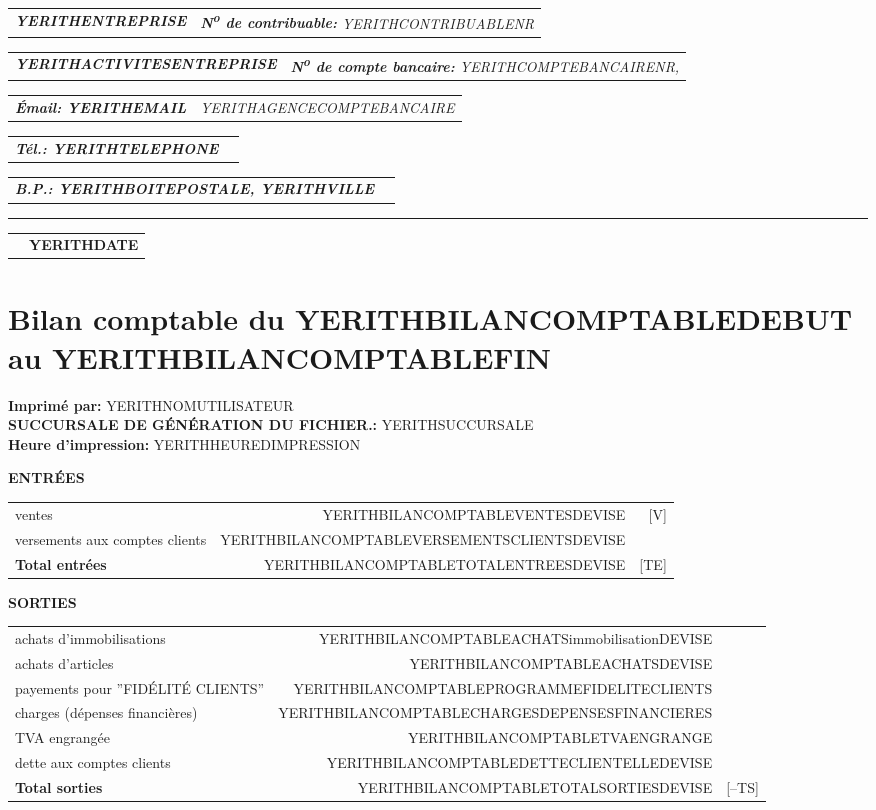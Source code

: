 \documentclass[10pt,YERITHPAPERSPEC,landscape]{article} %
\makeatletter
\newcommand{\headerrow}[2]
{\begin{tabular*}{\linewidth}{l@{\extracolsep{\fill}}r}
	#1 &
	#2 \\
\end{tabular*}}
\newcommand{\emphbold}[1]{\textbf{\emph{#1}}\xspace}
\makeatother
\begin{document}
\bigskip

\headerrow
	{\emphbold{YERITHENTREPRISE}}
	{\emph{\textbf{N\textsuperscript{o} de contribuable:} YERITHCONTRIBUABLENR}}
\headerrow
	{\emphbold{YERITHACTIVITESENTREPRISE}}
	{\emph{\textbf{N\textsuperscript{o} de compte bancaire:} YERITHCOMPTEBANCAIRENR,}}
\headerrow
	{\emphbold{\'Email: YERITHEMAIL}}
	{\emph{YERITHAGENCECOMPTEBANCAIRE}}
\headerrow
	{\emphbold{T\'el.: YERITHTELEPHONE}}
	{}
\headerrow
	{\emphbold{B.P.: YERITHBOITEPOSTALE, YERITHVILLE}}
	{}
	
\hrule

\headerrow
	{}
	{\textbf{YERITHDATE}}

\section*{Bilan comptable du YERITHBILANCOMPTABLEDEBUT au YERITHBILANCOMPTABLEFIN}

\textbf{Imprim\'e par:} YERITHNOMUTILISATEUR\\
\textbf{SUCCURSALE DE GÉNÉRATION DU FICHIER.:} YERITHSUCCURSALE\\
\textbf{Heure d'impression:} YERITHHEUREDIMPRESSION\\

\vspace*{0.15em}

\textbf{ENTR\'EES}
\begin{table}[!htbp]
\begin{tabular}{lrr}
ventes  						&  YERITHBILANCOMPTABLEVENTESDEVISE  			& [V] \\ 
versements aux comptes clients  &  YERITHBILANCOMPTABLEVERSEMENTSCLIENTSDEVISE  & \\ \hline
\textbf{Total entr\'ees}  		&  YERITHBILANCOMPTABLETOTALENTREESDEVISE & [TE] 		\\ 
\end{tabular}
\end{table}


\vspace*{0.15em}
\textbf{SORTIES}
\begin{table}[!htbp]
\begin{tabular}{lrr}
achats d'immobilisations					& YERITHBILANCOMPTABLEACHATSimmobilisationDEVISE		& \\
achats d'articles  						& YERITHBILANCOMPTABLEACHATSDEVISE  					& \\
payements pour ''FID\'ELIT\'E CLIENTS''  & YERITHBILANCOMPTABLEPROGRAMMEFIDELITECLIENTS  	& \\  
charges (d\'epenses financi\`eres) 		& YERITHBILANCOMPTABLECHARGESDEPENSESFINANCIERES  	& \\ 
TVA engrang\'ee  							& YERITHBILANCOMPTABLETVAENGRANGE 					&  \\
dette aux comptes clients\footnotemark   & YERITHBILANCOMPTABLEDETTECLIENTELLEDEVISE 			&  \\ \hline
\textbf{Total sorties}  		&  YERITHBILANCOMPTABLETOTALSORTIESDEVISE & [--TS] 			\\ 
\end{tabular}
\end{table}
\end{document}
